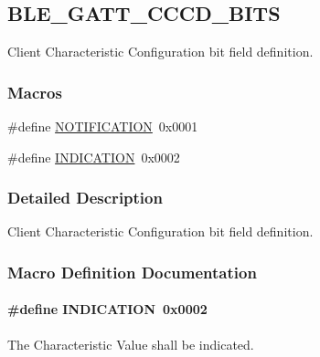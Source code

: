 \hypertarget{group___b_l_e___g_a_t_t___c_c_c_d___b_i_t_s}{}\subsection{B\+L\+E\+\_\+\+G\+A\+T\+T\+\_\+\+C\+C\+C\+D\+\_\+\+B\+I\+TS}
\label{group___b_l_e___g_a_t_t___c_c_c_d___b_i_t_s}


Client Characteristic Configuration bit field definition.  


\subsubsection*{Macros}
\begin{DoxyCompactItemize}
\item 
\#define \hyperlink{group___b_l_e___g_a_t_t___c_c_c_d___b_i_t_s_ga6985e58a0ff3195dca91e5aaca02e372}{N\+O\+T\+I\+F\+I\+C\+A\+T\+I\+ON}~0x0001
\item 
\#define \hyperlink{group___b_l_e___g_a_t_t___c_c_c_d___b_i_t_s_ga30384ab108bdb0798d60ad316b540a76}{I\+N\+D\+I\+C\+A\+T\+I\+ON}~0x0002
\end{DoxyCompactItemize}


\subsubsection{Detailed Description}
Client Characteristic Configuration bit field definition. 



\subsubsection{Macro Definition Documentation}
\paragraph[{\texorpdfstring{I\+N\+D\+I\+C\+A\+T\+I\+ON}{INDICATION}}]{\setlength{\rightskip}{0pt plus 5cm}\#define I\+N\+D\+I\+C\+A\+T\+I\+ON~0x0002}\hypertarget{group___b_l_e___g_a_t_t___c_c_c_d___b_i_t_s_ga30384ab108bdb0798d60ad316b540a76}{}\label{group___b_l_e___g_a_t_t___c_c_c_d___b_i_t_s_ga30384ab108bdb0798d60ad316b540a76}
The Characteristic Value shall be indicated. 

